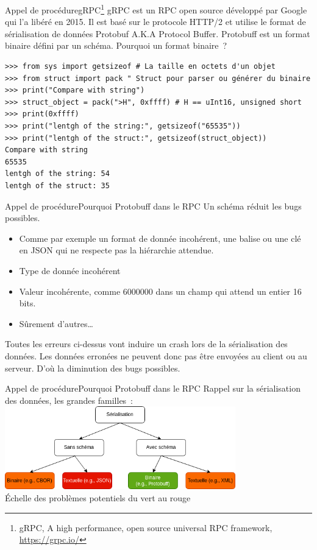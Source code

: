 \documentclass{beamer}
\begin{document}
    \begin{frame}[fragile]{Appel de procédure}{gRPC\footnote{gRPC, A high performance, open source universal RPC framework, \url{https://grpc.io/}}}
        gRPC est un RPC open source développé par Google qui l'a libéré en 2015.
        \bigbreak
        Il est basé sur le protocole HTTP/2 et utilise le format de sérialisation de données Protobuf A.K.A Protocol Buffer.
        Protobuff est un format binaire défini par un schéma.
        \bigbreak
        Pourquoi un format binaire~?
        \begin{lstlisting}
>>> from sys import getsizeof # La taille en octets d'un objet
>>> from struct import pack " Struct pour parser ou générer du binaire
>>> print("Compare with string")
>>> struct_object = pack(">H", 0xffff) # H == uInt16, unsigned short
>>> print(0xffff)
>>> print("lentgh of the string:", getsizeof("65535"))
>>> print("lentgh of the struct:", getsizeof(struct_object))
Compare with string
65535
lentgh of the string: 54
lentgh of the struct: 35
        \end{lstlisting}
    \end{frame}

    \begin{frame}{Appel de procédure}{Pourquoi Protobuff dans le RPC}
        Un schéma réduit les bugs possibles.
        \begin{itemize}
            \item Comme par exemple un format de donnée incohérent, une balise ou une clé en JSON qui ne respecte pas la hiérarchie attendue.
            \item Type de donnée incohérent
            \item Valeur incohérente, comme 6000000 dans un champ qui attend un entier 16 bits.
            \item Sûrement d'autres\ldots
        \end{itemize}
        \bigbreak
        Toutes les erreurs ci-dessus vont induire un crash lors de la sérialisation des données.
        Les données erronées ne peuvent donc pas être envoyées au client ou au serveur.
        D'où la diminution des bugs possibles.
    \end{frame}

    \begin{frame}{Appel de procédure}{Pourquoi Protobuff dans le RPC}
        Rappel sur la sérialisation des données, les grandes familles~:
        \bigbreak
        \centering
        \includegraphics[width=10cm]{image/serialization.drawio} \\ Échelle des problèmes potentiels du vert au rouge \\
    \end{frame}
\end{document}
